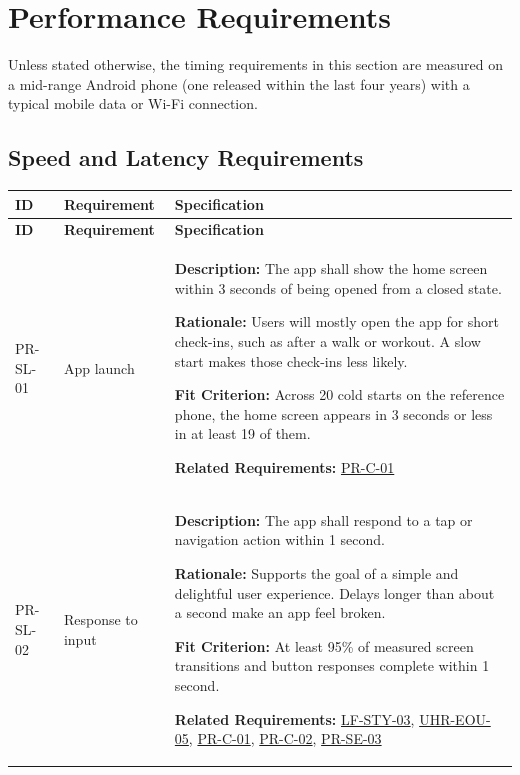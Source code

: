 \documentclass[12pt]{article}
\begin{document}
\section{Performance Requirements}

Unless stated otherwise, the timing requirements in this section are measured
on a mid-range Android phone (one released within the last four years) with a
typical mobile data or Wi-Fi connection.

\subsection{Speed and Latency Requirements}

\small
\setlength{\tabcolsep}{4pt}
\begin{xltabular}{\textwidth}{|p{2.6cm}|p{3.4cm}|X|}
\hline
\textbf{ID} & \textbf{Requirement} & \textbf{Specification} \\
\hline
\endfirsthead
\hline
\textbf{ID} & \textbf{Requirement} & \textbf{Specification} \\
\hline
\endhead

PR-SL-01\hypertarget{req:PR-SL-01}{} &
App launch &
\textbf{Description:} The app shall show the home screen within 3 seconds of being opened from a closed state.

\textbf{Rationale:} Users will mostly open the app for short check-ins, such as after a walk or workout. A slow start makes those check-ins less likely.

\textbf{Fit Criterion:} Across 20 cold starts on the reference phone, the home screen appears in 3 seconds or less in at least 19 of them.

\textbf{Related Requirements:} \hyperlink{req:PR-C-01}{PR-C-01}\\
\hline

PR-SL-02\hypertarget{req:PR-SL-02}{} &
Response to input &
\textbf{Description:} The app shall respond to a tap or navigation action within 1 second.

\textbf{Rationale:} Supports the goal of a simple and delightful user experience. Delays longer than about a second make an app feel broken.

\textbf{Fit Criterion:} At least 95\% of measured screen transitions and button responses complete within 1 second.

\textbf{Related Requirements:} \hyperlink{req:LF-STY-03}{LF-STY-03}, \hyperlink{req:UHR-EOU-05}{UHR-EOU-05}, \hyperlink{req:PR-C-01}{PR-C-01}, \hyperlink{req:PR-C-02}{PR-C-02}, \hyperlink{req:PR-SE-03}{PR-SE-03}\\
\hline


\end{xltabular}
\end{document}
